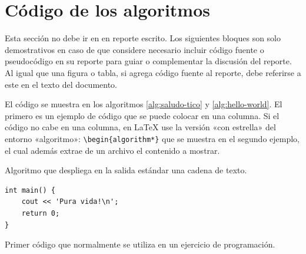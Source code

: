 \documentclass[twocolumn,english,spanish,journal]{IEEEtran}
\begin{document}
\newpage
\appendices{}


\section{Código de los algoritmos}

Esta sección no debe ir en en reporte escrito. Los siguientes bloques son solo demostrativos en caso de que considere necesario incluir código fuente o pseudocódigo en su reporte para guiar o complementar la discusión del reporte. Al igual que una figura o tabla, si agrega código fuente al reporte, debe referirse a este en el texto del documento.

El código se muestra en los algoritmos \ref{alg:saludo-tico} y \ref{alg:hello-world}. El primero es un ejemplo de código que se puede colocar en una columna. Si el código no cabe en una columna, en \protect\LaTeX{} use la versión «con estrella» del entorno «algoritmo»: \texttt{\textbackslash{}begin\{algorithm{*}\}} que se muestra en el segundo ejemplo, el cual además extrae de un archivo el contenido a mostrar.



\begin{algorithm}[h!]
\caption{Algoritmo que despliega en la salida estándar una cadena de texto.
\label{alg:saludo-tico}}

\begin{lstlisting}
int main() {
	cout << 'Pura vida!\n';
	return 0;
}
\end{lstlisting}
\end{algorithm}


\begin{algorithm*}
\caption{Primer código que normalmente se utiliza en un ejercicio de programación.
\label{alg:hello-world}}


\end{algorithm*}
\end{document}
